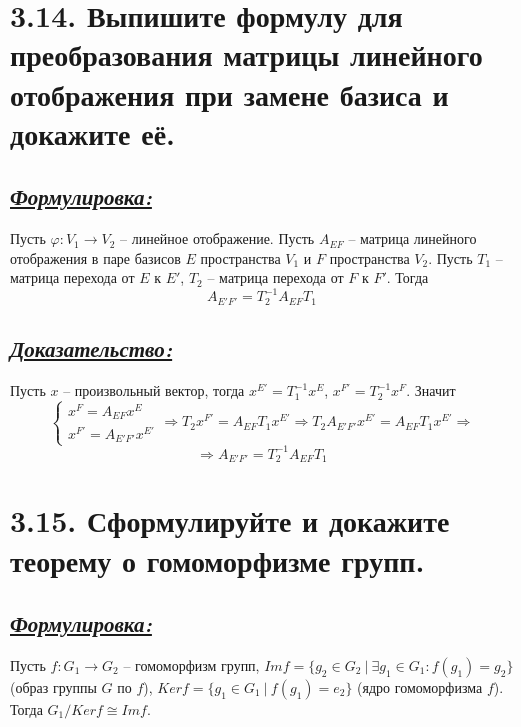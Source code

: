 \documentclass{article}
\begin{document}
\section*{\LARGE 3.14. Выпишите формулу для преобразования матрицы линейного отображения при замене базиса и докажите её. }
\subsection*{\Large \underline{\textit{Формулировка: }}}
Пусть $\varphi : V_1 \rightarrow V_2$ -- линейное отображение. Пусть $A_{EF}$ -- матрица линейного отображения в паре базисов $E$ пространства $V_1$ и $F$ пространства $V_2$. Пусть $T_1$ -- матрица перехода от $E$ к $E'$, $T_2$ --  матрица перехода от $F$ к $F'$. Тогда 
$$
A_{E'F'} = T_2^{-1}A_{EF}T_1
$$

\subsection*{\Large \underline{\textit{Доказательство: }}}
Пусть $x$ -- произвольный вектор, тогда $x^{E'} = T_1^{-1} x^E$, $x^{F'} = T_2^{-1} x^F$. Значит $$
\begin{cases}
x^{F} = A_{EF} x^{E} \\
x^{F'} = A_{E'F'} x^{E'}
\end{cases}
\Rightarrow
T_2 x^{F'} = A_{EF} T_1 x^{E'}
\Rightarrow
T_2 A_{E'F'} x^{E'} = A_{EF} T_1 x^{E'}
\Rightarrow
$$
$$
\Rightarrow
A_{E'F'} = T_2^{-1} A_{EF} T_1
$$

\section*{\LARGE 3.15. Сформулируйте и докажите теорему о гомоморфизме групп. }
\subsection*{\Large \underline{\textit{Формулировка: }}}

Пусть $f : G_1 \rightarrow G_2$ -- гомоморфизм групп,
\newline $Imf = \{g_2 \in G_2 \:|\: \exists g_1 \in G_1 : f(g_1) = g_2\}$ (образ группы $G$ по $f$), 
\newline $Kerf = \{g_1 \in G_1 \:|\: f(g_1) = e_2\}$ (ядро гомоморфизма $f$).
\newline Тогда $G_1/Kerf \cong Imf$.
\end{document}
